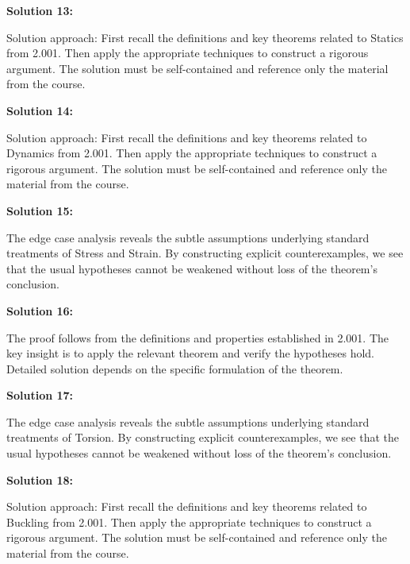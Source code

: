 \documentclass[12pt,a4paper]{exam}
\begin{document}
\vspace{0.5cm}

\textbf{Solution 13:}

Solution approach: First recall the definitions and key theorems related to Statics from 2.001. Then apply the appropriate techniques to construct a rigorous argument. The solution must be self-contained and reference only the material from the course.

\vspace{0.5cm}

\textbf{Solution 14:}

Solution approach: First recall the definitions and key theorems related to Dynamics from 2.001. Then apply the appropriate techniques to construct a rigorous argument. The solution must be self-contained and reference only the material from the course.

\vspace{0.5cm}

\textbf{Solution 15:}

The edge case analysis reveals the subtle assumptions underlying standard treatments of Stress and Strain. By constructing explicit counterexamples, we see that the usual hypotheses cannot be weakened without loss of the theorem's conclusion.

\vspace{0.5cm}

\textbf{Solution 16:}

The proof follows from the definitions and properties established in 2.001. The key insight is to apply the relevant theorem and verify the hypotheses hold. Detailed solution depends on the specific formulation of the theorem.

\vspace{0.5cm}

\textbf{Solution 17:}

The edge case analysis reveals the subtle assumptions underlying standard treatments of Torsion. By constructing explicit counterexamples, we see that the usual hypotheses cannot be weakened without loss of the theorem's conclusion.

\vspace{0.5cm}

\textbf{Solution 18:}

Solution approach: First recall the definitions and key theorems related to Buckling from 2.001. Then apply the appropriate techniques to construct a rigorous argument. The solution must be self-contained and reference only the material from the course.
\end{document}
